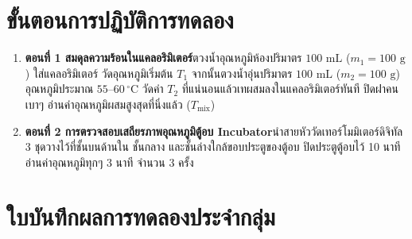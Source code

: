 \section{ขั้นตอนการปฏิบัติการทดลอง}
\begin{enumerate}
    \item \textbf{ตอนที่ 1 สมดุลความร้อนในแคลอริมิเตอร์}\quad ตวงน้ำอุณหภูมิห้องปริมาตร $100\text{ mL}$ ($m_1 = 100\text{ g}$) ใส่แคลอริมิเตอร์ วัดอุณหภูมิเริ่มต้น $T_1$ จากนั้นตวงน้ำอุ่นปริมาตร $100\text{ mL}$ ($m_2 = 100\text{ g}$) อุณหภูมิประมาณ $55\text{--}60\,^\circ\text{C}$ วัดค่า $T_2$ ที่แน่นอนแล้วเทผสมลงในแคลอริมิเตอร์ทันที ปิดฝาคนเบาๆ อ่านค่าอุณหภูมิผสมสูงสุดที่นิ่งแล้ว ($T_{\text{mix}}$)
    \item \textbf{ตอนที่ 2 การตรวจสอบเสถียรภาพอุณหภูมิตู้อบ Incubator}\quad นำสายหัววัดเทอร์โมมิเตอร์ดิจิทัล 3 ชุดวางไว้ที่ชั้นบนด้านใน ชั้นกลาง และชั้นล่างใกล้ขอบประตูของตู้อบ ปิดประตูตู้อบไว้ 10 นาที อ่านค่าอุณหภูมิทุกๆ 3 นาที จำนวน 3 ครั้ง
\end{enumerate}

\section{ใบบันทึกผลการทดลองประจำกลุ่ม}

